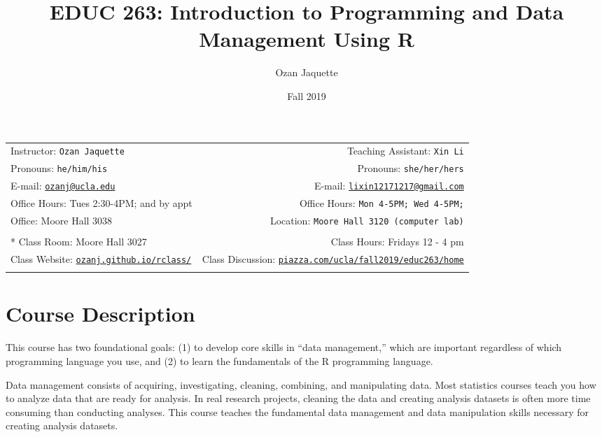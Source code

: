 \documentclass[11pt,]{article}
\title{EDUC 263: Introduction to Programming and Data Management Using R}
\author{Ozan Jaquette}
\date{Fall 2019}
\begin{document}
  

		\maketitle
		
	
		\thispagestyle{firststyle}



	\noindent \begin{tabular*}{\textwidth}{ @{\extracolsep{\fill}} lr @{\extracolsep{\fill}}}


Instructor: \texttt{Ozan Jaquette} & Teaching Assistant: \texttt{Xin Li} \\
Pronouns: \texttt{he/him/his} & Pronouns: \texttt{she/her/hers} \\
E-mail: \texttt{\href{mailto:ozanj@ucla.edu}{\nolinkurl{ozanj@ucla.edu}}} & E-mail: \texttt{\href{mailto:lixin12171217@gmail.com}{\nolinkurl{lixin12171217@gmail.com}}} \\ 
Office Hours: Tues 2:30-4PM; and by appt  & Office Hours: \texttt{Mon 4-5PM; Wed 4-5PM;} \\
Office: Moore Hall 3038 & Location: \texttt{Moore Hall 3120 (computer lab)} \\
\\ *
Class Room: Moore Hall 3027 & Class Hours: Fridays 12 - 4 pm\\
Class Website: \href{http://ozanj.github.io/rclass/}{\tt ozanj.github.io/rclass/} & Class Discussion: \href{http://piazza.com/ucla/fall2019/educ263/home}{\tt piazza.com/ucla/fall2019/educ263/home}\\
	&  \\
	\hline
	\end{tabular*}
	
\vspace{2mm}
	


\hypertarget{course-description}{%
\section{Course Description}\label{course-description}}

This course has two foundational goals: (1) to develop core skills in
``data management,'' which are important regardless of which programming
language you use, and (2) to learn the fundamentals of the R programming
language.

Data management consists of acquiring, investigating, cleaning,
combining, and manipulating data. Most statistics courses teach you how
to analyze data that are ready for analysis. In real research projects,
cleaning the data and creating analysis datasets is often more time
consuming than conducting analyses. This course teaches the fundamental
data management and data manipulation skills necessary for creating
analysis datasets.
\end{document}
